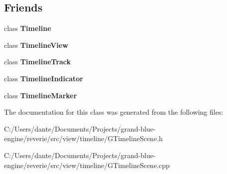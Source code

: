 \subsection*{Friends}
\begin{DoxyCompactItemize}
\item 
\mbox{\label{classrev_1_1_view_1_1_timeline_scene_ad55a3c161fedb629b674fd20d7235628}} 
class {\bfseries Timeline}
\item 
\mbox{\label{classrev_1_1_view_1_1_timeline_scene_a5bcb97c28be9925f71df877c2884f416}} 
class {\bfseries Timeline\+View}
\item 
\mbox{\label{classrev_1_1_view_1_1_timeline_scene_af0bf8129c86a24e22a0d3d458130c67b}} 
class {\bfseries Timeline\+Track}
\item 
\mbox{\label{classrev_1_1_view_1_1_timeline_scene_a07819c0d422f98e16605e266e71da017}} 
class {\bfseries Timeline\+Indicator}
\item 
\mbox{\label{classrev_1_1_view_1_1_timeline_scene_ac6474e94f2ecd0fae09e8a413c88180e}} 
class {\bfseries Timeline\+Marker}
\end{DoxyCompactItemize}


The documentation for this class was generated from the following files\+:\begin{DoxyCompactItemize}
\item 
C\+:/\+Users/dante/\+Documents/\+Projects/grand-\/blue-\/engine/reverie/src/view/timeline/G\+Timeline\+Scene.\+h\item 
C\+:/\+Users/dante/\+Documents/\+Projects/grand-\/blue-\/engine/reverie/src/view/timeline/G\+Timeline\+Scene.\+cpp\end{DoxyCompactItemize}
